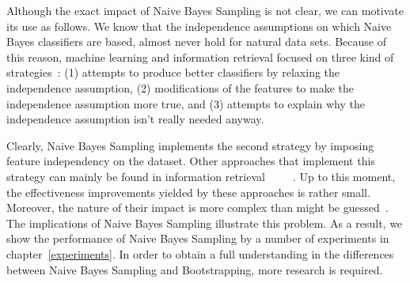 Although the exact impact of Naive Bayes Sampling is not clear, we can motivate its use as follows. We know that the independence assumptions on which Naive Bayes classifiers are based, almost never hold for natural data sets. Because of this reason, machine learning and information retrieval focused on three kind of strategies~\cite{lewis98}: (1) attempts to produce better classifiers by relaxing the independence assumption, (2) modifications of the features to make the independence assumption more true, and (3) attempts to explain why the independence assumption isn't really needed anyway.

Clearly, Naive Bayes Sampling implements the second strategy by imposing feature independency on the dataset. Other approaches that implement this strategy can mainly be found in information retrieval~\cite{booleanqueries}~\cite{bayesianinference}~\cite{harper78eval}~\cite{Turtle91evaluationof}~\cite{Rijsbergen77}.   
Up to this moment, the effectiveness improvements yielded by these approaches is rather small. Moreover, the nature of their impact is more complex than might be guessed~\cite{Church95oneterm}. The implications of Naive Bayes Sampling illustrate this problem. As a result, we show the performance of Naive Bayes Sampling by a number of experiments in chapter~\ref{experiments}. In order to obtain a full understanding in the differences between Naive Bayes Sampling and Bootstrapping, more research is required.


